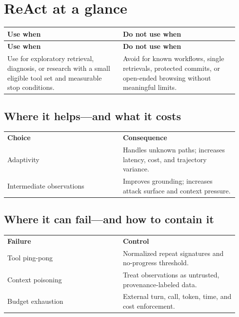 \section{ReAct at a glance}

\BookTableStart
\small
\begin{longtable}{@{}Y{0.4700\linewidth}Y{0.4700\linewidth}@{}}
\color{white}\bfseries \textbf{Use when} & \color{white}\bfseries \textbf{Do not use when} \\
\endfirsthead
{}
\color{white}\bfseries \textbf{Use when} & \color{white}\bfseries \textbf{Do not use when} \\
\endhead
Use for exploratory retrieval, diagnosis, or research with a small eligible tool set and measurable stop conditions. & Avoid for known workflows, single retrievals, protected commits, or open-ended browsing without meaningful limits. \\
\end{longtable}
\BookTableEnd

\subsection{Where it helps—and what it costs}

\BookTableStart
\small
\begin{tabular}{@{}Y{0.4700\linewidth}Y{0.4700\linewidth}@{}}
\color{white}\bfseries \textbf{Choice} & \color{white}\bfseries \textbf{Consequence} \\
Adaptivity & Handles unknown paths; increases latency, cost, and trajectory variance. \\
Intermediate observations & Improves grounding; increases attack surface and context pressure. \\
\end{tabular}
\BookTableEnd

\subsection{Where it can fail—and how to contain it}

\BookTableStart
\small
\begin{tabular}{@{}Y{0.4700\linewidth}Y{0.4700\linewidth}@{}}
\color{white}\bfseries \textbf{Failure} & \color{white}\bfseries \textbf{Control} \\
Tool ping-pong & Normalized repeat signatures and no-progress threshold. \\
Context poisoning & Treat observations as untrusted, provenance-labeled data. \\
Budget exhaustion & External turn, call, token, time, and cost enforcement. \\
\end{tabular}
\BookTableEnd

